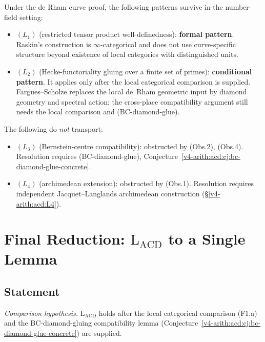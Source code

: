 \begin{corollary}
\label{v4-arith:acd:cor:transport-summary}
Under the de Rham curve proof, the
following patterns survive in the number-field setting:
\begin{itemize}
\item \((L_{1})\) (restricted tensor product well-definedness):
\textbf{formal pattern}. Raskin's construction is
\(\infty\)-categorical and does not use curve-specific structure beyond
existence of local categories with distinguished units.
\item \((L_{2})\) (Hecke-functoriality gluing over a finite set of
primes): \textbf{conditional pattern}. It applies only after the local
categorical comparison is supplied. Fargues--Scholze replaces the local de~Rham
geometric input by diamond geometry and spectral action; the
cross-place compatibility argument still needs the local comparison
and (BC-diamond-glue).
\end{itemize}
The following do \emph{not} transport:
\begin{itemize}
\item \((L_{3})\) (Bernstein-centre compatibility): obstructed by
(Obs.2), (Obs.4). Resolution requires (BC-diamond-glue),
Conjecture~\ref{v4-arith:acd:cj:bc-diamond-glue-concrete}.
\item \((L_{4})\) (archimedean extension): obstructed by (Obs.1).
Resolution requires independent Jacquet--Langlands archimedean
construction (\S\ref{v4-arith:acd:L4}).
\end{itemize}
\end{corollary}

\section{Final Reduction: \(\mathrm{L}_{\mathrm{ACD}}\) to a Single Lemma}
\label{v4-arith:acd:final-reduction}

\subsection{Statement}

\begin{theorem}
\label{v4-arith:acd:thm:LACD-single-lemma}
\emph{Comparison hypothesis.} \(\mathrm{L}_{\mathrm{ACD}}\) holds after
the local categorical comparison (F1.a) and the BC-diamond-gluing
compatibility lemma
(Conjecture~\ref{v4-arith:acd:cj:bc-diamond-glue-concrete}) are supplied.
\end{theorem}

